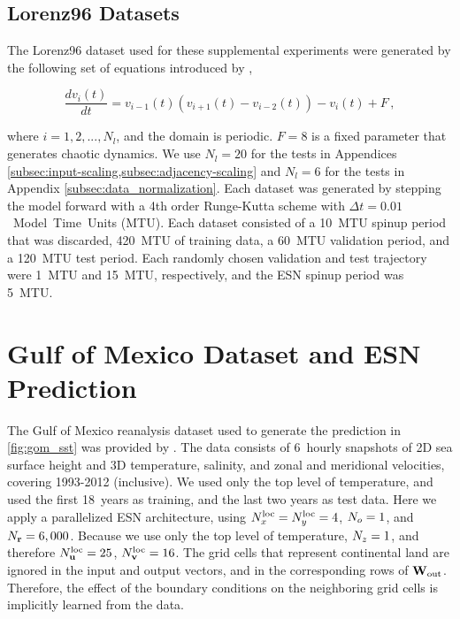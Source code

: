 \documentclass[draft]{agujournal2019}
\newcommand{\citet}{\citeA}
\begin{document}
\subsection{Lorenz96 Datasets}
\label{subsec:lorenz96}

The Lorenz96 dataset used for these supplemental experiments were generated by
the following set of equations introduced by \citet{lorenz_predictability_1996},
\begin{linenomath*}\begin{equation*}
    \frac{dv_i(t)}{dt} = v_{i-1}(t)(v_{i+1}(t) - v_{i-2}(t)) - v_i(t) + F \, ,
    \label{eq:lorenz96}
\end{equation*}\end{linenomath*}
where $i=1,2,...,N_{l}$, and the domain is periodic.
$F=8$ is a fixed parameter that generates chaotic dynamics.
We use $N_l = 20$ for the tests in
Appendices \cref{subsec:input-scaling,subsec:adjacency-scaling} and $N_l = 6$ for the tests
in Appendix \cref{subsec:data_normalization}.
Each dataset was generated by stepping the model forward with a 4th order
Runge-Kutta scheme with $\Delta t = 0.01$~Model~Time~Units (MTU).
Each dataset consisted of a 10~MTU spinup period that was discarded, 420~MTU of
training data, a 60~MTU validation period, and a 120~MTU test
period.
Each randomly chosen validation and test trajectory were 1~MTU and 15~MTU,
respectively, and the ESN spinup period was 5~MTU.


\section{Gulf of Mexico Dataset and ESN Prediction}
\label{sec:gom}

The Gulf of Mexico reanalysis dataset used to generate the prediction in
\cref{fig:gom_sst} was provided by \citet{gom_dataset}.
The data consists of 6~hourly snapshots of 2D sea surface height and 3D
temperature, salinity, and zonal and meridional velocities,
covering 1993-2012 (inclusive).
We used only the top level of temperature, and used the first 18~years as
training, and the last two years as test data.
Here we apply a parallelized ESN architecture, using
$N_{x}^\text{loc}=N_{y}^\text{loc}=4$, $N_{o}=1$, and $N_{\mathbf{r}}=6,000$.
Because we use only the top level of temperature, $N_{z}=1$, and therefore
$N_{\mathbf{u}}^\text{loc}=25$, $N_{\mathbf{v}}^\text{loc}=16$.
The grid cells that represent continental land are ignored in the input and
output vectors, and in the corresponding rows of $\mathbf{W}_\text{out}$.
Therefore, the effect of the boundary conditions on the neighboring grid cells
is implicitly learned from the data.
\end{document}
